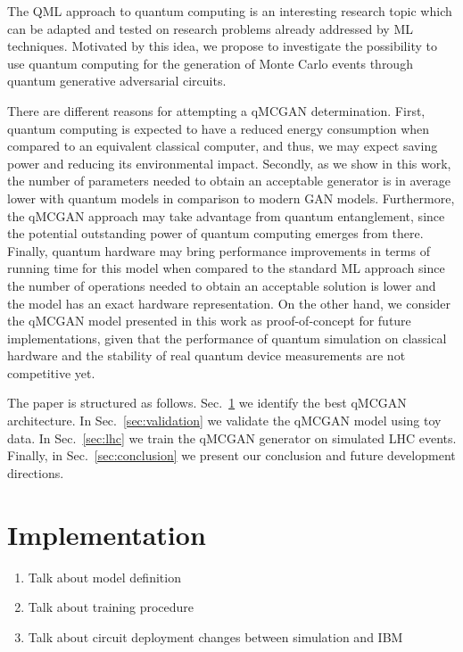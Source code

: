 \documentclass[twocolumn,preprintnumbers,superscriptaddress]{revtex4-2}
\begin{document}
The QML approach to quantum computing is an interesting research topic which can
be adapted and tested on research problems already addressed by ML techniques.
Motivated by this idea, we propose to investigate the possibility to use quantum
computing for the generation of Monte Carlo events through quantum generative
adversarial circuits.

There are different reasons for attempting a qMCGAN determination. First,
quantum computing is expected to have a reduced energy consumption when compared
to an equivalent classical computer, and thus, we may expect saving power and
reducing its environmental impact. Secondly, as we show in this work, the number
of parameters needed to obtain an acceptable generator is in average lower with
quantum models in comparison to modern GAN models. Furthermore, the qMCGAN
approach may take advantage from quantum entanglement, since the potential
outstanding power of quantum computing emerges from there. Finally, quantum
hardware may bring performance improvements in terms of running time for this
model when compared to the standard ML approach since the number of operations
needed to obtain an acceptable solution is lower and the model has an exact
hardware representation. On the other hand, we consider the qMCGAN model
presented in this work as proof-of-concept for future implementations, given
that the performance of quantum simulation on classical hardware and the
stability of real quantum device measurements are not competitive yet.

The paper is structured as follows. Sec.~\ref{sec:implementation} we identify
the best qMCGAN architecture. In Sec.~\ref{sec:validation} we validate the
qMCGAN model using toy data. In Sec.~\ref{sec:lhc} we train the qMCGAN generator
on simulated LHC events. Finally, in Sec.~\ref{sec:conclusion} we present our
conclusion and future development directions.

\section{Implementation}
\label{sec:implementation}

\begin{enumerate}
  \item Talk about model definition
  \item Talk about training procedure
  \item Talk about circuit deployment changes between simulation and IBM
\end{enumerate}
\end{document}
